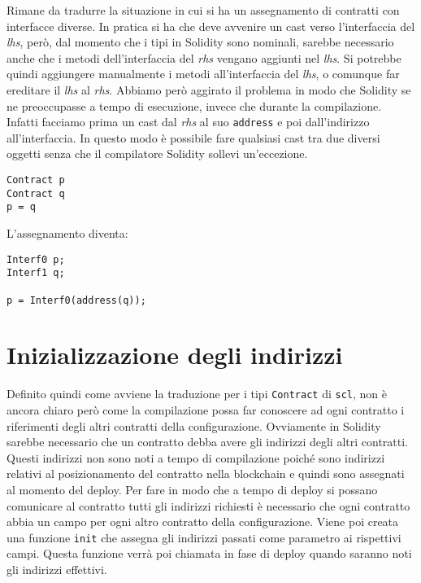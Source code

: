 \documentclass[12pt,a4paper]{report}
\begin{document}
Rimane da tradurre la situazione in cui si ha un assegnamento di
contratti con interfacce diverse. In pratica si ha che deve avvenire un
cast verso l'interfaccia del \emph{lhs}, però, dal momento che i tipi in
Solidity sono nominali, sarebbe necessario anche che i metodi
dell'interfaccia del \emph{rhs} vengano aggiunti nel \emph{lhs}. Si
potrebbe quindi aggiungere manualmente i metodi all'interfaccia del
\emph{lhs}, o comunque far ereditare il \emph{lhs} al \emph{rhs}.
Abbiamo però aggirato il problema in modo che Solidity se ne
preoccupasse a tempo di esecuzione, invece che durante la compilazione.
Infatti facciamo prima un cast dal \emph{rhs} al suo \texttt{address} e
poi dall'indirizzo all'interfaccia. In questo modo è possibile fare
qualsiasi cast tra due diversi oggetti senza che il compilatore Solidity
sollevi un'eccezione.

\begin{verbatim}
Contract p
Contract q
p = q
\end{verbatim}

L'assegnamento diventa:

\begin{verbatim}
Interf0 p;
Interf1 q;

p = Interf0(address(q));
\end{verbatim}

\hypertarget{inizializzazione-degli-indirizzi}{%
\section{Inizializzazione degli
indirizzi}\label{inizializzazione-degli-indirizzi}}

Definito quindi come avviene la traduzione per i tipi \texttt{Contract}
di \texttt{scl}, non è ancora chiaro però come la compilazione possa far
conoscere ad ogni contratto i riferimenti degli altri contratti della
configurazione. Ovviamente in Solidity sarebbe necessario che un
contratto debba avere gli indirizzi degli altri contratti. Questi
indirizzi non sono noti a tempo di compilazione poiché sono indirizzi
relativi al posizionamento del contratto nella blockchain e quindi sono
assegnati al momento del deploy. Per fare in modo che a tempo di deploy
si possano comunicare al contratto tutti gli indirizzi richiesti è
necessario che ogni contratto abbia un campo per ogni altro contratto
della configurazione. Viene poi creata una funzione \texttt{init} che
assegna gli indirizzi passati come parametro ai rispettivi campi. Questa
funzione verrà poi chiamata in fase di deploy quando saranno noti gli
indirizzi effettivi.
\end{document}
